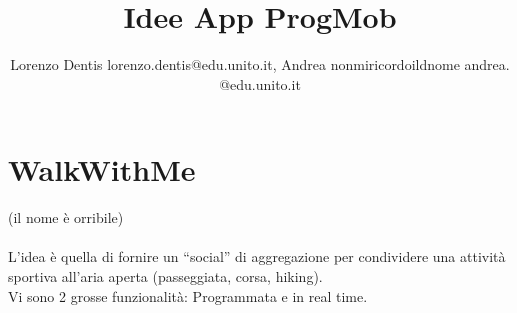 \documentclass[a4paper]{article}
\begin{document}
\author{Lorenzo Dentis lorenzo.dentis@edu.unito.it, Andrea nonmiricordoildnome andrea. @edu.unito.it}
\title{Idee App ProgMob}
\maketitle

\section{WalkWithMe}
(il nome è orribile) \\ \\
L’idea è quella di fornire un “social” di aggregazione per condividere una attività sportiva all’aria aperta (passeggiata, corsa, hiking).\\
Vi sono 2 grosse funzionalità: Programmata e in real time.
\end{document}
